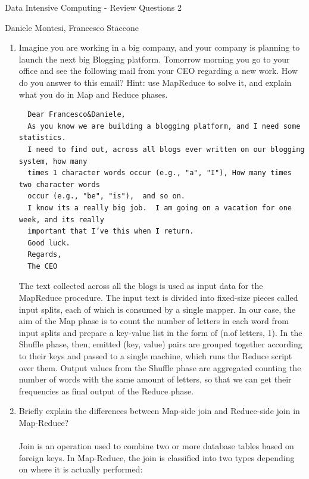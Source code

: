 \documentclass[]{report}
\begin{document}
\begin{center}
 {\Large Data Intensive Computing - Review Questions 2}
 \end{center}
 \begin{center}
 {\small Daniele Montesi, Francesco Staccone}
 \end{center}
 \vspace{1cm}
\justify
\begin{enumerate}
 \item Imagine you are working in a big company, and your company is planning to launch the next big Blogging platform. Tomorrow morning you go to your office and see the following mail from your CEO regarding a new work. How do you answer to this email? Hint: use MapReduce to solve it, and explain what you do in Map and Reduce phases. \\
  \begin{verbatim}
  Dear Francesco&Daniele,
  As you know we are building a blogging platform, and I need some statistics. 
  I need to find out, across all blogs ever written on our blogging system, how many 
  times 1 character words occur (e.g., "a", "I"), How many times two character words 
  occur (e.g., "be", "is"),  and so on.
  I know its a really big job.  I am going on a vacation for one week, and its really 
  important that I’ve this when I return.
  Good luck.
  Regards,
  The CEO
   \end{verbatim}
The text collected across all the blogs is used as input data for the MapReduce procedure. The input text is divided into fixed-size pieces called input splits, each of which is consumed by a single mapper. In our case, the aim of the Map phase is to count the number of letters in each word from input splits and prepare a key-value list in the form of (n.of letters, 1). In the Shuffle phase, then, emitted (key, value) pairs are grouped together according to their keys and passed to a single machine, which runs the Reduce script over them. Output values from the Shuffle phase are aggregated counting the number of words with the same amount of letters, so that we can get their frequencies as final output of the Reduce phase. \\
 
 \item Briefly explain the differences between Map-side join and Reduce-side join in Map-Reduce?\\\\
 Join is an operation used to combine two or more database tables based on foreign keys. In Map-Reduce, the join is classified into two types depending on where it is actually performed:\\


\end{enumerate}
\end{document}

